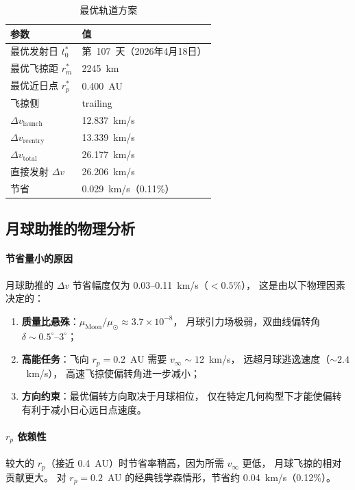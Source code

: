 \documentclass[a4paper,12pt]{article}
\begin{document}
\begin{table}[H]
  \centering
  \caption{最优轨道方案}\label{tab:optimal}
  \begin{tabular}{ll}
    \toprule
    参数 & 值 \\
    \midrule
    最优发射日 $t_0^*$ & 第~107~天（2026年4月18日） \\
    最优飞掠距 $r_m^*$ & 2245~km \\
    最优近日点 $r_p^*$ & 0.400~AU \\
    飞掠侧 & trailing \\
    $\Delta v_{\mathrm{launch}}$ & 12.837~km/s \\
    $\Delta v_{\mathrm{reentry}}$ & 13.339~km/s \\
    $\Delta v_{\mathrm{total}}$ & 26.177~km/s \\
    直接发射 $\Delta v$ & 26.206~km/s \\
    节省 & 0.029~km/s（0.11\%） \\
    \bottomrule
  \end{tabular}
\end{table}

\subsection{月球助推的物理分析}

\paragraph{节省量小的原因}
月球助推的 $\Delta v$ 节省幅度仅为 0.03--0.11~km/s（$< 0.5\%$），
这是由以下物理因素决定的：
\begin{enumerate}
  \item \textbf{质量比悬殊}：$\mu_{\mathrm{Moon}}/\mu_\odot \approx 3.7 \times 10^{-8}$，
        月球引力场极弱，双曲线偏转角 $\delta \sim 0.5^\circ$--$3^\circ$；
  \item \textbf{高能任务}：飞向 $r_p = 0.2$~AU 需要 $v_\infty \sim 12$~km/s，
        远超月球逃逸速度（$\sim 2.4$~km/s），
        高速飞掠使偏转角进一步减小；
  \item \textbf{方向约束}：最优偏转方向取决于月球相位，
        仅在特定几何构型下才能使偏转有利于减小日心远日点速度。
\end{enumerate}

\paragraph{$r_p$ 依赖性}
较大的 $r_p$（接近 0.4~AU）时节省率稍高，因为所需 $v_\infty$ 更低，
月球飞掠的相对贡献更大。
对 $r_p = 0.2$~AU 的经典钱学森情形，节省约 0.04~km/s（0.12\%）。
\end{document}
